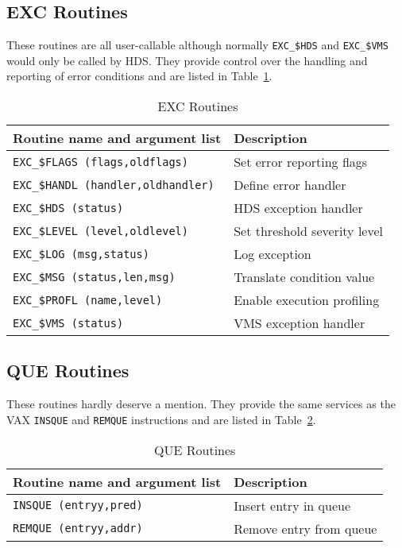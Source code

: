 \clearpage
\subsection {EXC Routines}

These routines are all user-callable although normally {\tt EXC\_\$HDS}
and {\tt EXC\_\$VMS} would only be called by HDS. They provide control over
the handling and reporting of error conditions and are listed in
Table~\ref{exc_routines}.

\begin {table}[htbp]
\begin {center}
\begin {tabular}{||l|l||}
\hline
Routine name and argument list		& Description \\
\hline
{\tt EXC\_\$FLAGS (flags,oldflags)}	& Set error reporting flags \\
{\tt EXC\_\$HANDL (handler,oldhandler)}	& Define error handler \\
{\tt EXC\_\$HDS (status)}		& HDS exception handler \\
{\tt EXC\_\$LEVEL (level,oldlevel)}	& Set threshold severity level \\
{\tt EXC\_\$LOG (msg,status)}		& Log exception \\
{\tt EXC\_\$MSG (status,len,msg)}	& Translate condition value \\
{\tt EXC\_\$PROFL (name,level)}		& Enable execution profiling \\
{\tt EXC\_\$VMS (status)}		& VMS exception handler \\
\hline
\end {tabular}
\caption {EXC Routines}
\label {exc_routines}
\end {center}
\end {table}

\subsection {QUE Routines}

These routines hardly deserve a mention. They provide the same services
as the VAX {\tt INSQUE} and {\tt REMQUE} instructions and are listed in
Table~\ref{que_routines}.

\begin {table}[htbp]
\begin {center}
\begin {tabular}{||l|l||}
\hline
Routine name and argument list	& Description \\
\hline
{\tt INSQUE (entryy,pred)}	& Insert entry in queue \\
{\tt REMQUE (entryy,addr)}	& Remove entry from queue \\
\hline
\end {tabular}
\caption {QUE Routines}
\label {que_routines}
\end {center}
\end {table}

